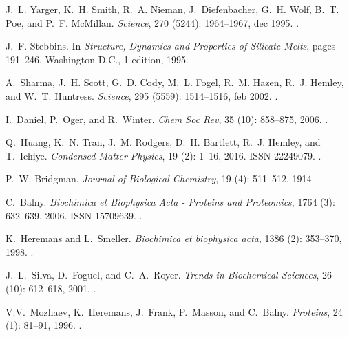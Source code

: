 \documentclass[aip,rsi,reprint,graphicx]{revtex4-1} %
\begin{document}
\begin{thebibliography}{57}
J.~L. Yarger, K.~H. Smith, R.~A. Nieman, J.~Diefenbacher, G.~H. Wolf, B.~T.
  Poe, and P.~F. McMillan.
\newblock \emph{Science}, 270 (5244): 1964--1967, dec 1995.
\newblock {}.

J.~F. Stebbins.
\newblock In \emph{Structure, Dynamics and Properties of Silicate Melts}, pages
  191--246. Washington D.C., 1 edition, 1995.

A.~Sharma, J.~H. Scott, G.~D. Cody, M.~L. Fogel, R.~M. Hazen, R.~J. Hemley, and
  W.~T. Huntress.
\newblock \emph{Science}, 295 (5559): 1514--1516, feb 2002.
\newblock {}.

I.~Daniel, P.~Oger, and R.~Winter.
\newblock \emph{Chem Soc Rev}, 35 (10): 858--875, 2006.
\newblock {}.

Q.~Huang, K.~N. Tran, J.~M. Rodgers, D.~H. Bartlett, R.~J. Hemley, and
  T.~Ichiye.
\newblock \emph{Condensed Matter Physics}, 19 (2): 1--16,
  2016.
\newblock ISSN 22249079.
\newblock {}.

P.~W. Bridgman.
\newblock \emph{Journal of Biological Chemistry}, 19 (4):
  511--512, 1914.

C.~Balny.
\newblock \emph{Biochimica et Biophysica Acta - Proteins and Proteomics},
  1764 (3): 632--639, 2006.
\newblock ISSN 15709639.
\newblock {}.

K.~Heremans and L.~Smeller.
\newblock \emph{Biochimica et biophysica acta}, 1386 (2):
  353--370, 1998.
\newblock {}.

J.~L.~Silva, D.~Foguel, and C.~A.~Royer.
\newblock \emph{Trends in Biochemical Sciences}, 26 (10):
  612--618, 2001.
\newblock {}.

V.V.~Mozhaev, K.~Heremans, J.~Frank, P.~Masson, and C.~Balny.
\newblock \emph{Proteins}, 24 (1): 81--91, 1996.
\newblock {}.


\end{thebibliography}
\end{document}
